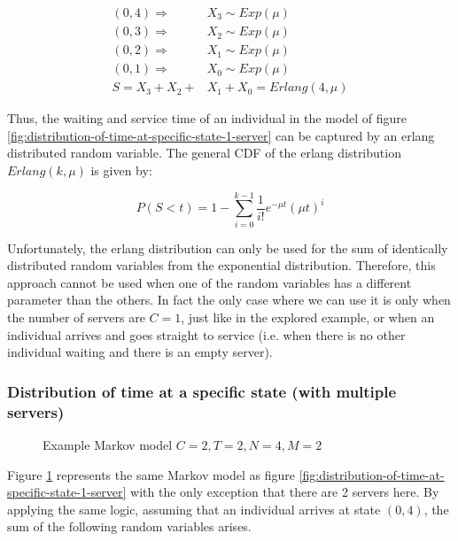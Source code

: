 \begin{align}
    (0,4) \Rightarrow \quad & X_3 \sim Exp(\mu) \nonumber \\
    (0,3) \Rightarrow \quad & X_2 \sim Exp(\mu) \nonumber \\
    (0,2) \Rightarrow \quad & X_1 \sim Exp(\mu) \nonumber \\
    (0,1) \Rightarrow \quad & X_0 \sim Exp(\mu) \nonumber \\
    S = X_3 + X_2 + & X_1 + X_0 = Erlang(4, \mu)
\end{align}

Thus, the waiting and service time of an individual in the model of figure 
\ref{fig:distribution-of-time-at-specific-state-1-server} can be captured by an 
erlang distributed random variable. 
The general CDF of the erlang distribution \(Erlang(k, \mu)\) is given by:

\begin{equation} \label{eq:cdf-erlang}
    P(S < t) = 1 - \sum_{i=0}^{k-1} \frac{1}{i!} e^{-\mu t} (\mu t)^i
\end{equation}

Unfortunately, the erlang distribution can only be used for the sum of 
identically distributed random variables from the exponential distribution. 
Therefore, this approach cannot be used when one of the random variables has a 
different parameter than the others. 
In fact the only case where we can use it is only when the number of servers are
\(C=1\), just like in the explored example, or when an individual arrives and 
goes straight to service (i.e. when there is no other individual waiting and 
there is an empty server).


\subsubsection{Distribution of time at a specific state (with multiple servers)}

\begin{figure}[h]
    \centering
    \scalebox{0.75}{}
    \caption{Example Markov model \(C=2, T=2, N=4, M=2\)}
    \label{fig:distribution-of-time-at-specific-state-2-servers}
\end{figure}

Figure \ref{fig:distribution-of-time-at-specific-state-2-servers} represents the 
same Markov model as figure 
\ref{fig:distribution-of-time-at-specific-state-1-server} with the only 
exception that there are 2 servers here. 
By applying the same logic, assuming that an individual arrives at state 
\((0,4)\), the sum of the following random variables arises.

